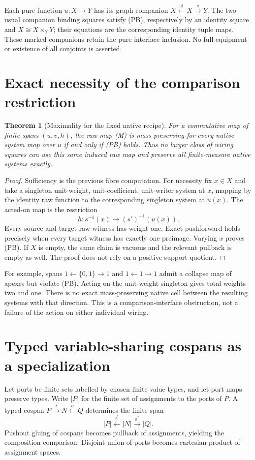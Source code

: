\documentclass{article}
\newtheorem{theorem}{Theorem}
\begin{document}
Each pure function $u:X\to Y$ has its graph companion $X\xleftarrow{\mathrm{id}}X\xrightarrow{u}Y$. The two usual companion binding squares satisfy (PB), respectively by an identity square and $X\cong X\times_Y Y$; their equations are the corresponding identity tuple maps. These marked companions retain the pure interface inclusion. No full equipment or existence of all conjoints is asserted.

\section{Exact necessity of the comparison restriction}
\begin{theorem}[Maximality for the fixed native recipe]
For a commutative map of finite spans $(u,v,h)$, the raw map (M) is mass-preserving for every native system map over $u$ if and only if (PB) holds. Thus no larger class of wiring squares can use this same induced raw map and preserve all finite-measure native systems exactly.
\end{theorem}
\begin{proof}
Sufficiency is the previous fibre computation. For necessity fix $x\in X$ and take a singleton unit-weight, unit-coefficient, unit-writer system at $x$, mapping by the identity raw function to the corresponding singleton system at $u(x)$. The acted-on map is the restriction
\[h:s^{-1}(x)\longrightarrow(s')^{-1}(u(x)).\]
Every source and target raw witness has weight one. Exact pushforward holds precisely when every target witness has exactly one preimage. Varying $x$ proves (PB). If $X$ is empty, the same claim is vacuous and the relevant pullback is empty as well. The proof does not rely on a positive-support quotient.
\end{proof}

For example, spans $1\leftarrow\{0,1\}\to1$ and $1\leftarrow1\to1$ admit a collapse map of apexes but violate (PB). Acting on the unit-weight singleton gives total weights two and one. There is no exact mass-preserving native cell between the resulting systems with that direction. This is a comparison-interface obstruction, not a failure of the action on either individual wiring.

\section{Typed variable-sharing cospans as a specialization}
Let ports be finite sets labelled by chosen finite value types, and let port maps preserve types. Write $|P|$ for the finite set of assignments to the ports of $P$. A typed cospan $P\xrightarrow{i}N\xleftarrow{o}Q$ determines the finite span
\[|P|\xleftarrow{i^*}|N|\xrightarrow{o^*}|Q|.\]
Pushout gluing of cospans becomes pullback of assignments, yielding the composition comparison. Disjoint union of ports becomes cartesian product of assignment spaces.
\end{document}
